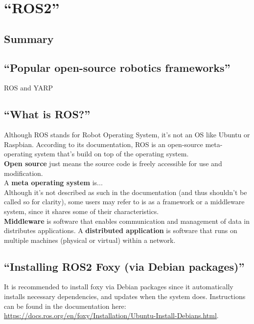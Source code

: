 \documentclass[a4paper, 10pt]{article}
\begin{document}
 \pagebreak

\section{``ROS2''}
\subsection*{Summary}
	\subsection{``Popular open-source robotics frameworks''}
	ROS and YARP

        \subsection{``What is ROS?''}
        Although ROS stands for Robot Operating System, it’s not an OS  like Ubuntu or Raspbian. According to its documentation, ROS is an open-source meta-operating system that’s build on top of the operating system.\\
        \textbf{Open source} just means the source code is freely accessible for use and modification.\\
        A \textbf{meta operating system} is... \\
        
        Although it’s not described as such in the documentation (and thus shouldn’t be called so for clarity), some users may refer to is as a framework or a middleware system, since it shares some of their characteristics.\\ 
        \textbf{Middleware} is software that enables communication and management of data in distributes applications. A \textbf{distributed application} is software that runs on multiple machines (physical or virtual) within a network. 


        \subsection{``Installing ROS2 Foxy (via Debian packages)''}
        It is recommended to install foxy via Debian packages since it automatically installs necessary dependencies, and updates when the system does. Instructions can be found in the documentation here: \\ \url{https://docs.ros.org/en/foxy/Installation/Ubuntu-Install-Debians.html}. \\
\end{document}
